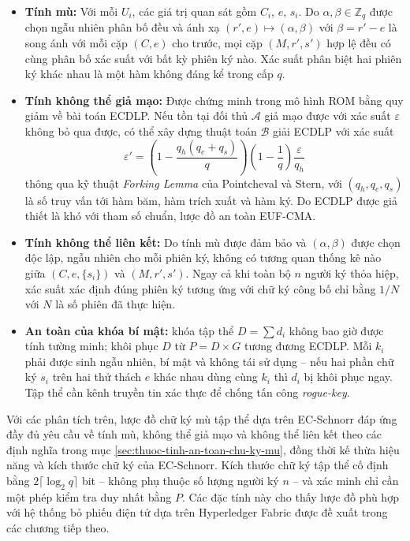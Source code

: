 \begin{itemize}
    \item \textbf{Tính mù:} Với mỗi $U_i$, các giá trị quan sát gồm $C_i$, $e$, $s_i$. Do $\alpha, \beta \in \mathbb{Z}_q$ được chọn ngẫu nhiên phân bố đều và ánh xạ $(r', e) \mapsto (\alpha, \beta)$ với $\beta = r' - e$ là song ánh với mỗi cặp $(C, e)$ cho trước, mọi cặp $(M, r', s')$ hợp lệ đều có cùng phân bố xác suất với bất kỳ phiên ký nào. Xác suất phân biệt hai phiên ký khác nhau là một hàm không đáng kể trong cấp $q$.

    \item \textbf{Tính không thể giả mạo:} Được chứng minh trong mô hình ROM bằng quy giảm về bài toán ECDLP. Nếu tồn tại đối thủ $\mathcal{A}$ giả mạo được với xác suất $\varepsilon$ không bỏ qua được, có thể xây dựng thuật toán $\mathcal{B}$ giải ECDLP với xác suất
    \begin{equation*}
        \varepsilon' = \left(1 - \frac{q_h(q_e + q_s)}{q}\right)\left(1 - \frac{1}{q}\right)\frac{\varepsilon}{q_h}
    \end{equation*}
    thông qua kỹ thuật \textit{Forking Lemma} của Pointcheval và Stern, với $(q_h, q_e, q_s)$ là số truy vấn tới hàm băm, hàm trích xuất và hàm ký. Do ECDLP được giả thiết là khó với tham số chuẩn, lược đồ an toàn EUF-CMA.

    \item \textbf{Tính không thể liên kết:} Do tính mù được đảm bảo và $(\alpha, \beta)$ được chọn độc lập, ngẫu nhiên cho mỗi phiên ký, không có tương quan thống kê nào giữa $(C, e, \{s_i\})$ và $(M, r', s')$. Ngay cả khi toàn bộ $n$ người ký thỏa hiệp, xác suất xác định đúng phiên ký tương ứng với chữ ký công bố chỉ bằng $1/N$ với $N$ là số phiên đã thực hiện.

    \item \textbf{An toàn của khóa bí mật:} khóa tập thể $D = \sum d_i$ không bao giờ được tính tường minh; khôi phục $D$ từ $P = D \times G$ tương đương ECDLP. Mỗi $k_i$ phải được sinh ngẫu nhiên, bí mật và không tái sử dụng -- nếu hai phần chữ ký $s_i$ trên hai thử thách $e$ khác nhau dùng cùng $k_i$ thì $d_i$ bị khôi phục ngay. Tập thể cần kênh truyền tin xác thực để chống tấn công \textit{rogue-key}.
\end{itemize}

Với các phân tích trên, lược đồ chữ ký mù tập thể dựa trên EC-Schnorr đáp ứng đầy đủ yêu cầu về tính mù, không thể giả mạo và không thể liên kết theo các định nghĩa trong mục \ref{sec:thuoc-tinh-an-toan-chu-ky-mu}, đồng thời kế thừa hiệu năng và kích thước chữ ký của EC-Schnorr. Kích thước chữ ký tập thể cố định bằng $2 \lceil \log_2 q \rceil$ bit -- không phụ thuộc số lượng người ký $n$ -- và xác minh chỉ cần một phép kiểm tra duy nhất bằng $P$. Các đặc tính này cho thấy lược đồ phù hợp với hệ thống bỏ phiếu điện tử dựa trên Hyperledger Fabric được đề xuất trong các chương tiếp theo.
